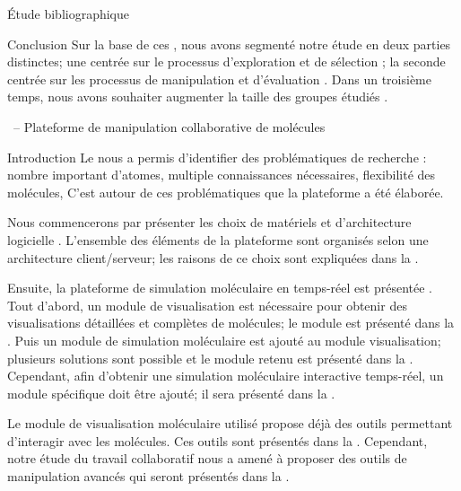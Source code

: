 \documentclass[myfrancais,ngerman,english,frenchb]{mythesis}
\begin{document}
\begin{mychapter}{Étude bibliographique}
\begin{mysection}{Conclusion}
			Sur la base de ces , nous avons segmenté notre étude en deux parties distinctes; une centrée sur le processus d'exploration et de sélection ; la seconde centrée sur les processus de manipulation et d'évaluation .
			Dans un troisième temps, nous avons souhaiter augmenter la taille des groupes étudiés .
		\end{mysection}
	\end{mychapter}
	\begin{mychapter}{\myShaddock\ -- Plateforme de manipulation collaborative de molécules}
		\begin{mysection}{Introduction}
			Le  nous a permis d'identifier des problématiques de recherche : nombre important d'atomes, multiple connaissances nécessaires, flexibilité des molécules, \myetc
			C'est autour de ces problématiques que la plateforme \myShaddock a été élaborée.

			Nous commencerons par présenter les choix de matériels et d'architecture logicielle .
			L'ensemble des éléments de la plateforme sont organisés selon une architecture client/serveur; les raisons de ce choix sont expliquées dans la .

			Ensuite, la plateforme de simulation moléculaire en temps-réel est présentée .
			Tout d'abord, un module de visualisation est nécessaire pour obtenir des visualisations détaillées et complètes de molécules; le module est présenté dans la .
			Puis un module de simulation moléculaire est ajouté au module visualisation; plusieurs solutions sont possible et le module retenu est présenté dans la .
			Cependant, afin d'obtenir une simulation moléculaire interactive temps-réel, un module spécifique doit être ajouté; il sera présenté dans la .

			Le module de visualisation moléculaire utilisé propose déjà des outils permettant d'interagir avec les molécules.
			Ces outils sont présentés dans la .
			Cependant, notre étude du travail collaboratif nous a amené à proposer des outils de manipulation avancés qui seront présentés dans la .


\end{mysection}
\end{mychapter}
\end{document}
